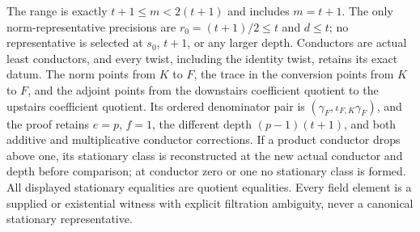 \begin{theorem}
\leanok
{}
\FormalizationContract
The range is exactly $t+1\le m<2(t+1)$ and includes $m=t+1$.
The only norm-representative precisions are
$r_0=(t+1)/2\le t$ and $d\le t$; no representative is selected at
$s_0$, $t+1$, or any larger depth.  Conductors are actual least conductors,
and every twist, including the identity twist, retains its exact datum.
The norm points from $K$ to $F$, the trace in the conversion points from
$K$ to $F$, and the adjoint points from the downstairs coefficient quotient
to the upstairs coefficient quotient.  Its ordered denominator pair is
$(\gamma_F,\iota_{F,K}\gamma_F)$, and the proof retains $e=p$, $f=1$, the
different depth $(p-1)(t+1)$, and both additive and multiplicative conductor
corrections.  If a product conductor drops above one, its stationary class
is reconstructed at the new actual conductor and depth before comparison;
at conductor zero or one no stationary class is formed.  All displayed
stationary equalities are quotient equalities.  Every field element is a
supplied or existential witness with explicit filtration ambiguity, never a
canonical stationary representative.
\end{theorem}
